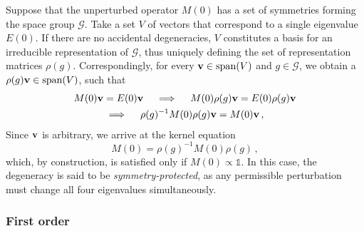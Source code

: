 Suppose that the unperturbed operator $M(0)$ has a set of symmetries forming the space group $\mathcal{G}$. Take a set $V$ of vectors that correspond to a single eigenvalue $E(0)$.  If there are no accidental degeneracies, $V$ constitutes a basis for an irreducible representation of $\mathcal{G}$, thus uniquely defining the set of representation matrices $\rho(g)$. Correspondingly, for every $\vb{v} \in \text{span}(V)$ and $g \in \mathcal{G}$, we obtain a $\rho(g) \vb{v} \in \text{span}(V)$, such that
\begin{equation}
\begin{gathered}
M(0)\vb{v} = E(0) \vb{v} \quad \implies \quad M(0) \rho(g) \vb{v} = E(0) \rho(g) \vb{v} \\
\implies \quad \rho(g)^{-1} M(0) \rho(g) \vb{v} =  M(0) \vb{v} \,,
\end{gathered}
\end{equation}
Since $\vb{v}$ is arbitrary, we arrive at the kernel equation
\begin{equation} \label{seq:zeroconstraint}
M(0) = \rho(g)^{-1} M(0) \rho(g)\,,
\end{equation}
which, by construction, is satisfied only if $M(0) \propto \mathbb{1}$. In this case, the degeneracy is said to be \textit{symmetry-protected}, as any permissible perturbation must change all four eigenvalues simultaneously.
\\

\subsubsection{First order} 


